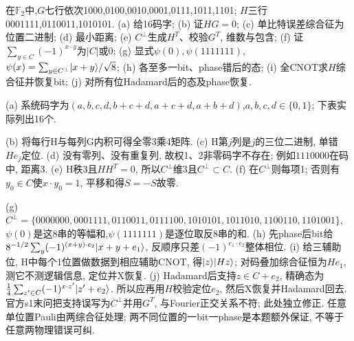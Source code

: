 \begin{exercise}在$\mathbb F_2$中,$G$七行依次1000,0100,0010,0001,0111,1011,1101; $H$三行0001111,0110011,1010101. (a) 给16码字; (b) 证$HG=0$; (c) 单比特误差综合征为位置二进制; (d) 最小距离; (e) $C^\perp$生成$H^T$、校验$G^T$, 维数与包含; (f) 证$\sum_{y\in C}(-1)^{x\cdot y}$为$|C|$或0; (g) 显式$\psi(0),\psi(1111111)$, $\psi(x)=\sum_{y\in C^\perp}\lvert x+y\rangle/\sqrt8$; (h) 各至多一bit、phase错后的态; (i) 全CNOT求$H$综合征并恢复bit; (j) 对所有位Hadamard后的态及phase恢复.\end{exercise}
\begin{solution}(a) 系统码字为$(a,b,c,d,b+c+d,a+c+d,a+b+d)$,$a,b,c,d\in\{0,1\}$; 下表实际列出16个.

(b) 将每行H与每列G内积可得全零3乘4矩阵. (c) H第$j$列是$j$的三位二进制, 单错$He_j$定位. (d) 没有零列、没有重复列, 故权1、2非零码字不存在; 例如$1110000$在码中, 距离3. (e) H秩3且$HH^T=0$, 所以$C^\perp$维3且$C^\perp\subset C$. (f) 在$C^\perp$则每项1; 否则有$y_0\in C$使$x\cdot y_0=1$, 平移和得$S=-S$故零.

(g) $C^\perp=\{0000000,0001111,0110011,0111100,1010101,1011010,1100110,1101001\}$, $\psi(0)$是这8串的等幅和,$\psi(1111111)$是逐位取反8串的和. (h) 先phase后bit给$8^{-1/2}\sum_y(-1)^{(x+y)\cdot e_2}\lvert x+y+e_1\rangle$, 反顺序只差$(-1)^{e_1\cdot e_2}$整体相位. (i) 给三辅助位, H中每个1位置做数据到相应辅助CNOT, 得$\lvert z\rangle\lvert Hz\rangle$; 对码叠加综合征恒为$He_1$, 测它不测逻辑信息, 定位并X恢复. (j) Hadamard后支持$z\in C+e_2$, 精确态为$\frac14\sum_{z'\in C}(-1)^{x\cdot z'}\lvert z'+e_2\rangle$. 所以应再用$H$校验定位$e_2$, 然后X恢复并Hadamard回去. 官方s1末问把支持误写为$C^\perp$并用$G^T$, 与Fourier正交关系不符; 此处独立修正. 任意单位置Pauli由两综合征处理; 两不同位置的一bit一phase是本题额外保证, 不等于任意两物理错误可纠.
\end{solution}

